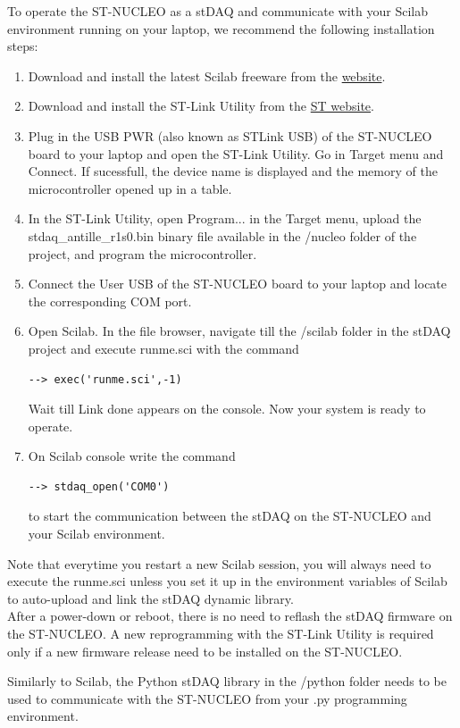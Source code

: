 \documentclass[letterpaper,10pt,english]{hitec}
\begin{document}
To operate the ST-NUCLEO as a stDAQ and communicate with your Scilab environment running on your laptop, we recommend the following installation steps:
\begin{enumerate}
\item Download and install the latest Scilab freeware from the \href{https://www.scilab.org/}{website}.
\item Download and install the ST-Link Utility from the \href{https://www.st.com/en/development-tools/stsw-link004.html}{ST website}.
\item Plug in the USB PWR (also known as STLink USB) of the ST-NUCLEO board to your laptop and open the ST-Link Utility. Go in Target menu and Connect. If sucessfull, the device name is displayed and the memory of the microcontroller opened up in a table. 
\item In the ST-Link Utility, open Program... in the Target menu, upload the stdaq\_antille\_r1s0.bin binary file available in the /nucleo folder of the project, and program the microcontroller. 
\item Connect the User USB of the ST-NUCLEO board to your laptop and locate the corresponding COM port.
\item Open Scilab. In the file browser, navigate till the /scilab folder in the stDAQ project and execute runme.sci with the command
\begin{verbatim}
--> exec('runme.sci',-1)
\end{verbatim}
Wait till Link done appears on the console. Now your system is ready to operate.
\item On Scilab console write the command 
\begin{verbatim}
--> stdaq_open('COM0')
\end{verbatim}
to start the communication between the stDAQ on the ST-NUCLEO and your Scilab environment.
\end{enumerate}

Note that everytime you restart a new Scilab session, you will always need to execute the runme.sci unless you set it up in the environment variables of Scilab to auto-upload and link the stDAQ dynamic library. \\
After a power-down or reboot, there is no need to reflash the stDAQ firmware on the ST-NUCLEO. 
A new reprogramming with the ST-Link Utility is required only if a new firmware release need to be installed on the ST-NUCLEO.

Similarly to Scilab, the Python stDAQ library in the /python folder needs to be used to communicate with the ST-NUCLEO from your .py programming environment.
\end{document}
